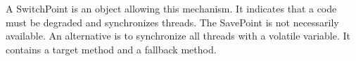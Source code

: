 \documentclass{sigplanconf}
\def \VM{VM\xspace}
\begin{document}
        A SwitchPoint is an object allowing this mechanism.
        It indicates that a code must be degraded and synchronizes threads.
        The SavePoint is not necessarily available.
        An alternative is to synchronize all threads with a volatile variable.
        It contains a target method and a fallback method.
        
        
% 
% 
% 
% 
\end{document}
